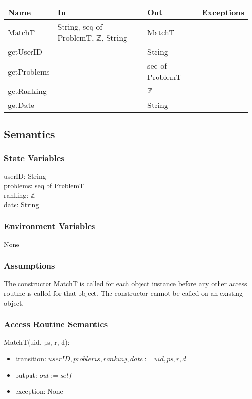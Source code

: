 \documentclass[12pt, titlepage]{article}
\begin{document}
\begin{center}
\begin{tabular}{ |  p{4cm} | p{3cm} |  p{3cm} | p{5cm} | }
\hline
\textbf{Name} & \textbf{In} & \textbf{Out} & \textbf{Exceptions} \\
\hline
MatchT & String, seq of ProblemT, $\mathbb{Z}$, String  & MatchT & \\
getUserID & & String & \\
getProblems & & seq of ProblemT & \\
getRanking & & $\mathbb{Z}$ & \\
getDate & & String & \\

\hline
\end{tabular}
\end{center}

\subsection{Semantics}


\subsubsection{State Variables}

userID: String\\
problems: seq of ProblemT\\
ranking: $\mathbb{Z}$\\
date: String

\subsubsection{Environment Variables}
None

\subsubsection{Assumptions}
The constructor MatchT is called for each object instance before any other access routine is called for that object. The constructor cannot be called on an existing object.

\subsubsection{Access Routine Semantics}

\noindent MatchT(uid, ps, r, d):
\begin{itemize}
\item transition: $userID, problems, ranking, date := uid, ps, r, d$
\item output: $out := self$
\item exception: None
\end{itemize}
\end{document}
